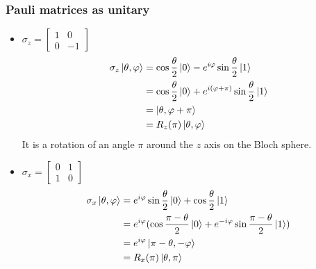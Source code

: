 \documentclass{article}
\begin{document}
\subsubsection*{Pauli matrices as unitary}

\begin{itemize}[label=-]
    \item $\sigma_z = \begin{bmatrix}
        1 & 0 \\ 0 & -1
    \end{bmatrix}$
    \begin{equation}
        \begin{aligned}
            \sigma_z\ket{\theta, \varphi}
                & = \cos \frac{\theta}{2}\ket{0} - e^{i\varphi}\sin\frac{\theta}{2}\ket{1} \\
                & = \cos \frac{\theta}{2}\ket{0} + e^{i(\varphi + \pi)}\sin\frac{\theta}{2}\ket{1} \\
                & = \ket{\theta, \varphi + \pi} \\
                & = R_z(\pi)\ket{\theta, \varphi}
        \end{aligned}
    \end{equation}
    It is a rotation of an angle $\pi$ around the $z$ axis on the Bloch sphere.

    \item $\sigma_x = \begin{bmatrix}
        0 & 1 \\ 1 & 0
    \end{bmatrix}$
    \begin{equation}
        \begin{aligned}
            \sigma_x\ket{\theta, \varphi}
                & = e^{i\varphi}\sin\frac{\theta}{2}\ket{0} + \cos\frac{\theta}{2}\ket{1} \\
                & = e^{i\varphi}(\cos\frac{\pi-\theta}{2}\ket{0} +
                e^{-i\varphi}\sin\frac{\pi-\theta}{2}\ket{1}) \\
                & = e^{i\varphi}\ket{\pi - \theta, -\varphi} \\
                & = R_x(\pi)\ket{\theta, \pi}
        \end{aligned}
    \end{equation}


\end{itemize}
\end{document}
